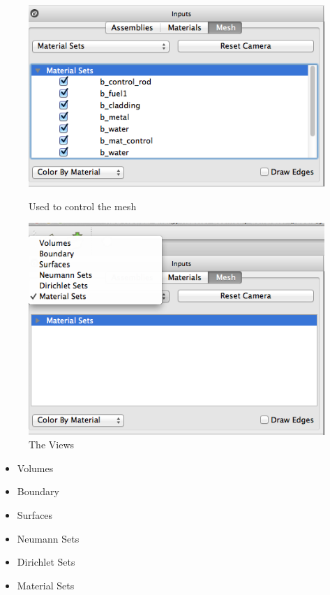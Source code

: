 \begin{figure}
        \vspace{-4.5cm}
	\begin{center}
		\includegraphics[width=0.95\linewidth]{Images/mash-tab.png}
		\caption{Used to control the mesh}
		\label{fig:mainwindow4}
	\end{center}
	\vspace{10pt}
	\begin{center}
		\includegraphics[width=0.95\linewidth]{Images/overview-of-mesh-options.png}
		\caption{The Views}
		\label{fig:meshViews}
	\end{center}
	\vspace{-1.5cm}
\end{figure}

\begin{itemize}
	\item{Volumes}
	\item{Boundary}
	\item{Surfaces}
	\item{Neumann Sets}
	\item{Dirichlet Sets}
	\item{Material Sets}
\end{itemize}


